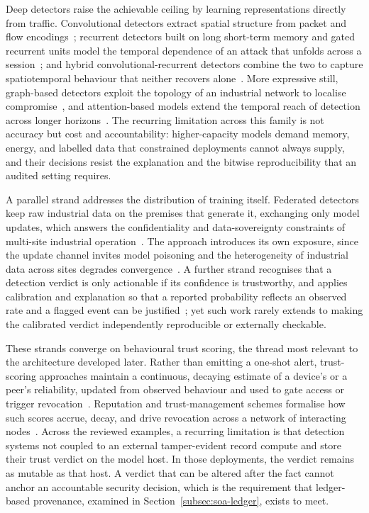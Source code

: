 Deep detectors raise the achievable ceiling by learning representations directly
from traffic. Convolutional detectors extract spatial structure from packet and
flow encodings~\cite{alshehri2024selfattention, hassini2024endtoend}; recurrent
detectors built on long short-term memory and gated recurrent units model the
temporal dependence of an attack that unfolds across a
session~\cite{chen2024xgboostlstm, raeiszadeh2024realtime}; and hybrid
convolutional-recurrent detectors combine the two to capture spatiotemporal
behaviour that neither recovers alone~\cite{chen2025cnnlstm,
anwer2025federated}. More expressive still, graph-based detectors exploit the
topology of an industrial network to localise
compromise~\cite{villegas2025dynamic, deng2025edgefeatured}, and attention-based
models extend the temporal reach of detection across longer
horizons~\cite{akuthota2025transformer, ishtiaq2025cstafnet}. The recurring
limitation across this family is not accuracy but cost and accountability:
higher-capacity models demand memory, energy, and labelled data that constrained
deployments cannot always supply, and their decisions resist the explanation and
the bitwise reproducibility that an audited setting requires.

A parallel strand addresses the distribution of training itself. Federated
detectors keep raw industrial data on the premises that generate it, exchanging
only model updates, which answers the confidentiality and data-sovereignty
constraints of multi-site industrial operation~\cite{lee2025lightweight,
mao2025fedinnid}. The approach introduces its own exposure, since the update
channel invites model poisoning and the heterogeneity of industrial data across
sites degrades convergence~\cite{quyen2025fedkd, sun2025personalized}. A further
strand recognises that a detection verdict is only actionable if its confidence
is trustworthy, and applies calibration and explanation so that a reported
probability reflects an observed rate and a flagged event can be
justified~\cite{shoukat2025trustids, pal2025calibrated}; yet such work rarely
extends to making the calibrated verdict independently reproducible or
externally checkable.

These strands converge on behavioural trust scoring, the thread most relevant to
the architecture developed later. Rather than emitting a one-shot alert,
trust-scoring approaches maintain a continuous, decaying estimate of a device's
or a peer's reliability, updated from observed behaviour and used to gate access
or trigger revocation~\cite{anwer2025tead, awan2025stacktrust}. Reputation and
trust-management schemes formalise how such scores accrue, decay, and drive
revocation across a network of interacting
nodes~\cite{bampatsikos2025trustscore, wang2025continuous}. Across the reviewed
examples, a recurring limitation is that detection systems not coupled to an
external tamper-evident record compute and store their trust verdict on the model
host. In those deployments, the verdict remains as mutable as that host. A
verdict that can be altered after the fact cannot anchor an accountable security
decision, which is the requirement that ledger-based provenance, examined in
Section~\ref{subsec:soa-ledger}, exists to meet.

